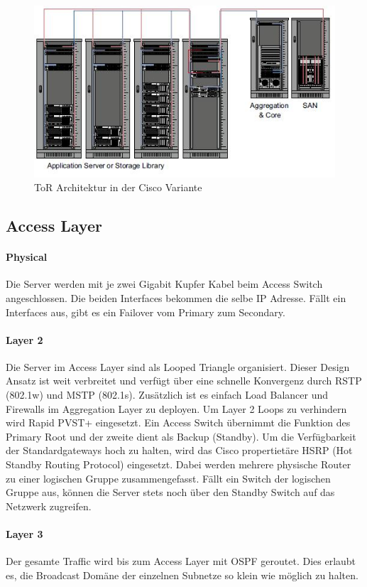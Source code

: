 \begin{figure}[h]
\centering
\includegraphics[width=0.5\linewidth]{images/tor_architecture}
\caption{ToR Architektur in der Cisco Variante}
\label{fig:torarchitecture}
\end{figure}



\subsection{Access Layer}
\paragraph{Physical}
Die Server werden mit je zwei Gigabit Kupfer Kabel beim Access Switch angeschlossen. Die beiden Interfaces bekommen die selbe IP Adresse. Fällt ein Interfaces aus, gibt es ein Failover vom Primary zum Secondary.

\paragraph{Layer 2}
Die Server im Access Layer sind als Looped Triangle organisiert. Dieser Design Ansatz ist weit verbreitet und verfügt über eine schnelle Konvergenz durch RSTP (802.1w) und MSTP (802.1s). Zusätzlich ist es einfach Load Balancer und Firewalls im Aggregation Layer zu deployen. Um Layer 2 Loops zu verhindern wird Rapid PVST+ eingesetzt. Ein Access Switch übernimmt die Funktion des Primary Root und der zweite dient als Backup (Standby). Um die Verfügbarkeit der Standardgateways hoch zu halten, wird das Cisco propertietäre HSRP (Hot Standby Routing Protocol) eingesetzt.  Dabei werden mehrere physische Router zu einer logischen Gruppe zusammengefasst. Fällt ein Switch der logischen Gruppe aus, können die Server stets noch über den Standby Switch auf das Netzwerk zugreifen. 

\paragraph{Layer 3}
Der gesamte Traffic wird bis zum Access Layer mit OSPF geroutet. Dies erlaubt es, die Broadcast Domäne der einzelnen Subnetze so klein wie möglich zu halten.

